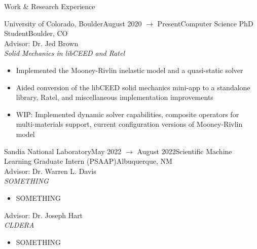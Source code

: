 \documentclass{resume} %
\begin{document}
\begin{rSection}{Work \& Research Experience}
\begin{rSubsection}{University of Colorado, Boulder}{August 2020 $\to$ Present}{Computer Science PhD Student}{Boulder, CO}\\
Advisor: Dr. Jed Brown\\
\textit{Solid Mechanics in libCEED and Ratel}
\begin{itemize}
    \renewcommand\labelitemi{\textbullet}
    \setlength \itemsep{-0.4em}
    \item Implemented the Mooney-Rivlin inelastic model and a quasi-static solver
    \item Aided conversion of the libCEED solid mechanics mini-app to a standalone library, Ratel, and miscellaneous implementation improvements
    \item WIP: Implemented dynamic solver capabilities, composite operators for multi-materials support, current configuration versions of Mooney-Rivlin model
\end{itemize}
\end{rSubsection}

\begin{rSubsection}{Sandia National Laboratory}{May 2022 $\to$ August 2022}{Scientific Machine Learning Graduate Intern (PSAAP)}{Albuquerque, NM}\\
Advisor: Dr. Warren L. Davis\\
\textit{SOMETHING}
\begin{itemize}
    \renewcommand\labelitemi{\textbullet}
    \setlength \itemsep{-0.4em}
    \item SOMETHING
\end{itemize}
Advisor: Dr. Joseph Hart\\
\textit{CLDERA}
\begin{itemize}
    \renewcommand\labelitemi{\textbullet}
    \setlength \itemsep{-0.4em}
    \item SOMETHING
\end{itemize}
\end{rSubsection}


\end{rSection}
\end{document}
